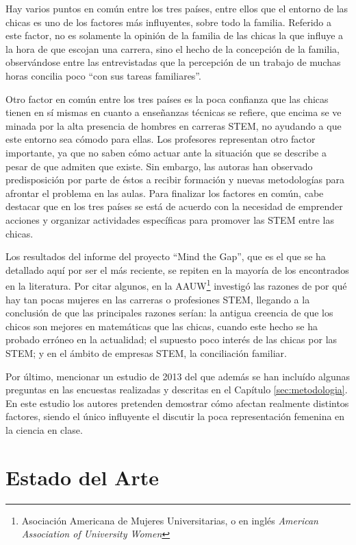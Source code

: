 \documentclass[runningheads,a4paper]{llncs}
\begin{document}
Hay varios puntos en común entre los tres países, entre ellos que el entorno de las chicas es uno de los factores más influyentes, sobre todo la familia. Referido a este factor, no es solamente la opinión de la familia de las chicas la que influye a la hora de que escojan una carrera, sino el hecho de la concepción de la familia, observándose entre las entrevistadas que la percepción de un trabajo de muchas horas concilia poco ``con sus tareas familiares''.

Otro factor en común entre los tres países es la poca confianza que las chicas tienen en sí mismas en cuanto a enseñanzas técnicas se refiere, que encima se ve minada por la alta presencia de hombres en carreras STEM, no ayudando a que este entorno sea cómodo para ellas. Los profesores representan otro factor importante, ya que no saben cómo actuar ante la situación que se describe a pesar de que admiten que existe. Sin embargo, las autoras han observado predisposición por parte de éstos a recibir formación y nuevas metodologías para afrontar el problema en las aulas. Para finalizar los factores en común, cabe destacar que en los tres países se está de acuerdo con la necesidad de emprender acciones y organizar actividades específicas para promover las STEM entre las chicas.

Los resultados del informe del proyecto ``Mind the Gap'', que es el que se ha detallado aquí por ser el más reciente, se repiten en la mayoría de los encontrados en la literatura. Por citar algunos, en \cite{hill2010so} la AAUW\footnote{Asociación Americana de Mujeres Universitarias, o en inglés \textit{American Association of University Women}} investigó las razones de por qué hay tan pocas mujeres en las carreras o profesiones STEM, llegando a la conclusión de que las principales razones serían: la antigua creencia de que los chicos son mejores en matemáticas que las chicas, cuando este hecho se ha probado erróneo en la actualidad; el supuesto poco interés de las chicas por las STEM; y en el ámbito de empresas STEM, la conciliación familiar. 

Por último, mencionar un estudio de 2013 \cite{hazari2013factors} del que además se han incluído algunas preguntas en las encuestas realizadas y descritas en el Capítulo \ref{sec:metodologia}. En este estudio los autores pretenden demostrar cómo afectan realmente distintos factores, siendo el único influyente el discutir la poca representación femenina en la ciencia en clase.

\section{Estado del Arte}
\label{sec:EdA}
\end{document}
